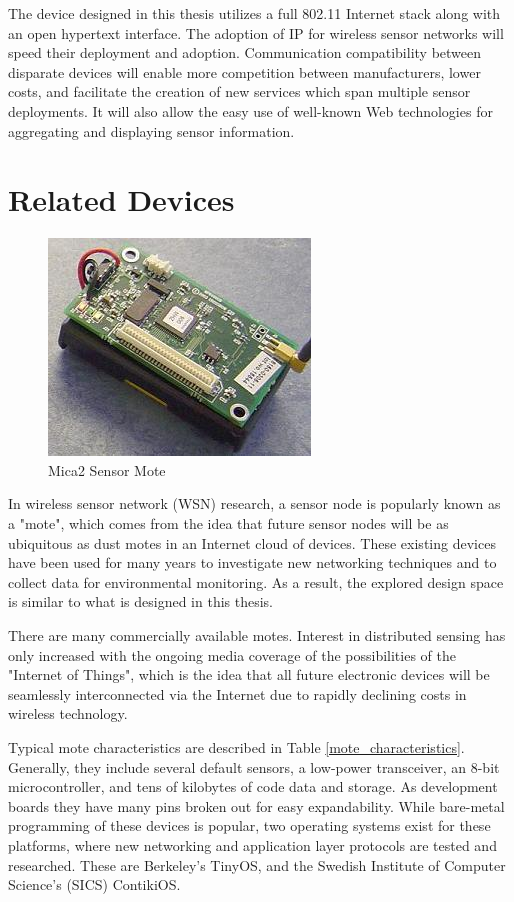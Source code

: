 The device designed in this thesis utilizes a full 802.11 Internet stack along with an open hypertext interface. The adoption of IP for wireless sensor networks will speed their deployment and adoption. Communication compatibility between disparate devices will enable more competition between manufacturers, lower costs, and facilitate the creation of new services which span multiple sensor deployments. It will also allow the easy use of well-known Web technologies for aggregating and displaying sensor information.

\section{Related Devices}

\begin{figure}[h]
\includegraphics{images/mica2mote}
\caption{Mica2 Sensor Mote\cite{mica2mote_img}}
\label{mica2}
\end{figure}

In wireless sensor network (WSN) research, a sensor node is popularly known as a "mote", which comes from the idea that future sensor nodes will be as ubiquitous as dust motes in an Internet cloud of devices. These existing devices have been used for many years to investigate new networking techniques and to collect data for environmental monitoring. As a result, the explored design space is similar to what is designed in this thesis. 

There are many commercially available motes. Interest in distributed sensing has only increased with the ongoing media coverage of the possibilities of the "Internet of Things", which is the idea that all future electronic devices will be seamlessly interconnected via the Internet due to rapidly declining costs in wireless technology. 

Typical mote characteristics are described in Table \ref{mote_characteristics}. Generally, they include several default sensors, a low-power transceiver, an 8-bit microcontroller, and tens of kilobytes of code data and storage. As development boards they have many pins broken out for easy expandability. While bare-metal programming of these devices is popular, two operating systems exist for these platforms, where new networking and application layer protocols are tested and researched. These are Berkeley's TinyOS, and the Swedish Institute of Computer Science's (SICS) ContikiOS.

